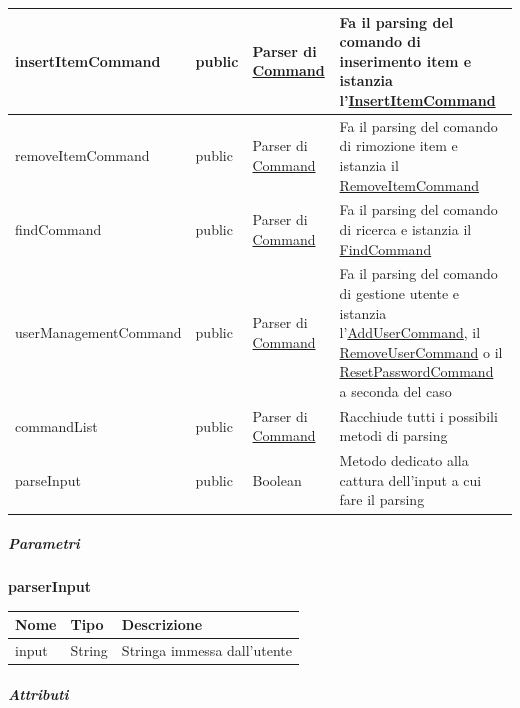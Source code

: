\documentclass{scalatekids-article}
\begin{document}
\begin{tabular}{| p{5.5cm} | p{1.5cm} | p{2cm} | p{7.5cm} |}
  \hline
  insertItemCommand & public & Parser di \hyperref[sec:actorbase::cli::models::Command]{Command} & Fa il parsing del comando di inserimento item e istanzia l'\hyperref[sec:actorbase::cli::models::InsertItemCommand]{InsertItemCommand}\\
  \hline
  removeItemCommand & public & Parser di \hyperref[sec:actorbase::cli::models::Command]{Command} &
                                                                                                   Fa il parsing del comando di rimozione item e istanzia il \hyperref[sec:actorbase::cli::models::RemoveItemCommand]{RemoveItemCommand}\\
  \hline
  findCommand & public & Parser di \hyperref[sec:actorbase::cli::models::Command]{Command} & Fa il parsing del comando di ricerca e istanzia il \hyperref[sec:actorbase::cli::models::FindCommand]{FindCommand}\\
  \hline
  userManagementCommand & public & Parser di \hyperref[sec:actorbase::cli::models::Command]{Command} & Fa il parsing del comando di gestione utente e istanzia l'\hyperref[sec:actorbase::cli::models::AddUserCommand]{AddUserCommand}, il \hyperref[sec:actorbase::cli::models::RemoveUserCommand]{RemoveUserCommand} o il \hyperref[sec:actorbase::cli::models::ResetPasswordCommand]{ResetPasswordCommand} a seconda del caso\\
  \hline
  commandList & public & Parser di \hyperref[sec:actorbase::cli::models::Command]{Command} & Racchiude tutti i possibili metodi di parsing\\
  \hline
  parseInput & public & Boolean & Metodo dedicato alla cattura dell'input a cui fare il parsing\\
  \hline
\end{tabular}

\subparagraph{Parametri}

\begin{center}
  \textbf{parserInput}
\end{center}
\begin{tabular}{| p{3cm} | p{3.5cm} | p{8.5cm} |}
  \hline
  Nome & Tipo & Descrizione\\
  \hline
  input & String & Stringa immessa dall'utente\\
  \hline
\end{tabular}

\subparagraph{Attributi}
\end{document}
